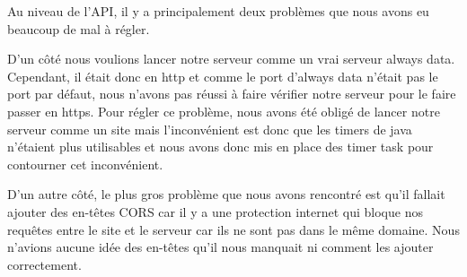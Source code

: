 \begin{flushleft}
Au niveau de l'API, il y a principalement deux problèmes que nous avons eu beaucoup de mal à régler.
\end{flushleft}

\begin{flushleft}
D'un côté nous voulions lancer notre serveur comme un vrai serveur always data. Cependant, il était donc en http et comme le port d'always data n'était pas le port par défaut, nous n'avons pas réussi à faire vérifier notre serveur pour le faire passer en https. Pour régler ce problème, nous avons été obligé de lancer notre serveur comme un site mais l'inconvénient est donc que les timers de java n'étaient plus utilisables et nous avons donc mis en place des timer task pour contourner cet inconvénient.
\end{flushleft}

\begin{flushleft}
D'un autre côté, le plus gros problème que nous avons rencontré est qu'il fallait ajouter des en-têtes CORS car il y a une protection internet qui bloque nos requêtes entre le site et le serveur car ils ne sont pas dans le même domaine. Nous n'avions aucune idée des en-têtes qu'il nous manquait ni comment les ajouter correctement.
\end{flushleft}

